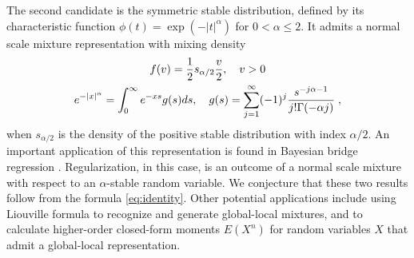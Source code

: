 \documentclass[lineno]{biometrika}
\begin{document}
The second candidate is the symmetric stable distribution, defined by its characteristic function $\phi(t) = \exp( -|t|^{\alpha})$ for $0 < \alpha \leq 2$.  
It admits a normal scale mixture representation with mixing density 
\begin{gather*}
  f(v) = \frac{1}{2} s_{\alpha/2} \frac{v}{2},\quad v > 0 
  \\
  e^{-|x|^\alpha} = \int_0^{\infty} e^{-xs} g(s) ds, \quad g(s) 
  = \sum_{j=1}^{\infty} (-1)^j \frac{s^{-j\alpha-1}}{j! \Gamma(-\alpha j)}
  \;,
\end{gather*}
when $s_{\alpha/2}$ is the density of the positive stable distribution with index $\alpha / 2$.  An important application of this representation is found in
Bayesian bridge regression \citep{polson_bayesian_2014}.  Regularization, in this case, is an outcome of a normal scale mixture with respect to an
$\alpha$-stable random variable.  We conjecture that these two results follow from the \CS{} formula \eqref{eq:identity}. Other potential applications include using Liouville formula to recognize and generate global-local mixtures, and to calculate higher-order closed-form moments $E(X^n)$ for random variables $X$ that admit a global-local representation. 



\end{document}
